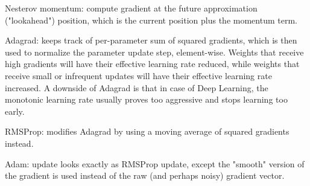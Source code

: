 \documentclass[12pt]{article}
\begin{document}
\item Nesterov momentum: compute gradient at the future approximation ("lookahead") position, which is the current position plus the momentum term.
\item Adagrad: keeps track of per-parameter sum of squared gradients, which is then used to normalize the parameter update step, element-wise. Weights that receive high gradients will have their effective learning rate reduced, while weights that receive small or infrequent updates will have their effective learning rate increased. A downside of Adagrad is that in case of Deep Learning, the monotonic learning rate usually proves too aggressive and stops learning too early.
\item RMSProp: modifies Adagrad by using a moving average of squared gradients instead.
\item Adam: update looks exactly as RMSProp update, except the "smooth" version of the gradient is used instead of the raw (and perhaps noisy) gradient vector.
\ule
\end{document}
